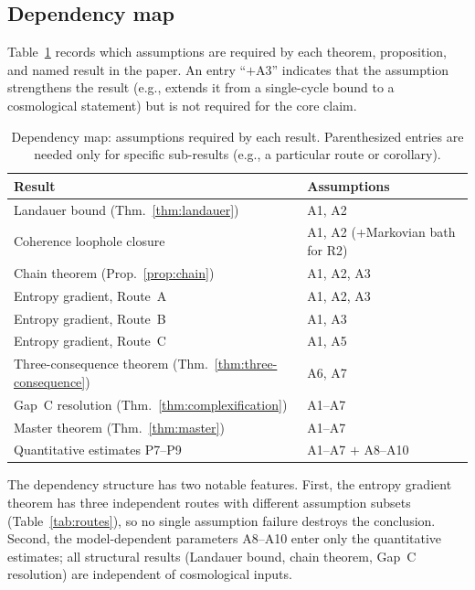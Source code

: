 \subsection{Dependency map}\label{app:dep-map}

Table~\ref{tab:dep-map} records which assumptions are required by
each theorem, proposition, and named result in the paper.  An entry
``$+$A3'' indicates that the assumption strengthens the result
(e.g., extends it from a single-cycle bound to a cosmological
statement) but is not required for the core claim.

\begin{table}[t]
  \centering
  \caption{Dependency map: assumptions required by each result.
  Parenthesized entries are needed only for specific sub-results
  (e.g., a particular route or corollary).}
  \label{tab:dep-map}
  \begin{tabular}{@{}l l@{}}
    \toprule
    Result & Assumptions \\
    \midrule
    Landauer bound (Thm.~\ref{thm:landauer})
      & A1, A2 \\
    Coherence loophole closure
      & A1, A2 (+Markovian bath for R2) \\
    Chain theorem (Prop.~\ref{prop:chain})
      & A1, A2, A3 \\
    Entropy gradient, Route~A
      & A1, A2, A3 \\
    Entropy gradient, Route~B
      & A1, A3 \\
    Entropy gradient, Route~C
      & A1, A5 \\
    Three-consequence theorem (Thm.~\ref{thm:three-consequence})
      & A6, A7 \\
    Gap~C resolution (Thm.~\ref{thm:complexification})
      & A1--A7 \\
    Master theorem (Thm.~\ref{thm:master})
      & A1--A7 \\
    Quantitative estimates P7--P9
      & A1--A7 $+$ A8--A10 \\
    \bottomrule
  \end{tabular}
\end{table}

\noindent
The dependency structure has two notable features.  First, the entropy
gradient theorem has three independent routes with different assumption
subsets (Table~\ref{tab:routes}), so no single assumption failure
destroys the conclusion.  Second, the model-dependent parameters
A8--A10 enter only the quantitative estimates; all structural results
(Landauer bound, chain theorem, Gap~C resolution) are independent of
cosmological inputs.
